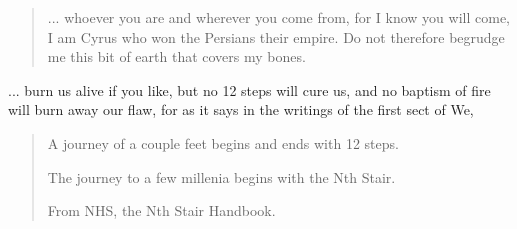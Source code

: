 \Sentence
{ \hX{} }
{ \eX{} }
{
    \begin{quote}
    ... whoever you are and wherever you come from, for I know you will come, I am Cyrus who won the Persians their empire. Do not therefore begrudge me this bit of earth that covers my bones.
    \end{quote}
}

\Sentence
{ \hX{} }
{ \eX{} }
{
    ... burn us alive if you like, but no 12 steps will cure us, and no baptism of fire will burn away our flaw, for as it says in the writings of the first sect of We,
}

\Sentence
{ \hX{} }
{ \eX{} }
{
    \begin{quote}
    A journey of a couple feet begins and ends with 12 steps.

    The journey to a few millenia begins with the Nth Stair.

    From NHS, the Nth Stair Handbook.
    \end{quote}
}
